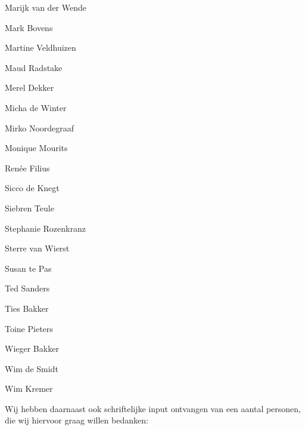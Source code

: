 \documentclass[smallauthor, chapterhaspagenum, nochapterinheader, pagenuminheader,  bigchapnum,medium2, tocpages,  garamond, titleinheader]{jote-book}
\begin{document}
\begin{references}
		Marijk van der Wende



		Mark Bovens



		Martine Veldhuizen



		Maud Radstake



		Merel Dekker



		Micha de Winter



		Mirko Noordegraaf



		Monique Mourits



		Renée Filius



		Sicco de Knegt



		Siebren Teule



		Stephanie Rozenkranz



		Sterre van Wierst



		Susan te Pas



		Ted Sanders



		Ties Bakker



		Toine Pieters



		Wieger Bakker



		Wim de Smidt



		Wim Kremer


	\end{references}

	\vspace*{\baselineskip}

	\noindent Wij hebben daarnaast ook schriftelijke input ontvangen van een aantal personen, die wij hiervoor graag willen bedanken:

	\vspace*{\baselineskip}
\end{document}
